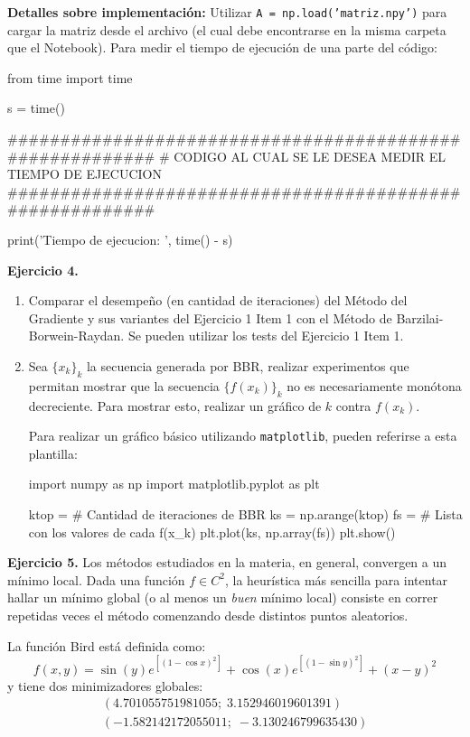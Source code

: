\documentclass{article}
\begin{document}
\textbf{Detalles sobre implementación:}
Utilizar \texttt{A = np.load('matriz.npy')} para cargar la matriz desde el archivo (el cual debe encontrarse en la misma carpeta que el Notebook).
Para medir el tiempo de ejecución de una parte del código: 

\vspace*{\baselineskip}
\begin{python}
from time import time

s = time()

#########################################################
# CODIGO AL CUAL SE LE DESEA MEDIR EL TIEMPO DE EJECUCION
#########################################################

print('Tiempo de ejecucion: ', time() - s)
\end{python}

\vspace*{\baselineskip}
\textbf{Ejercicio 4.} 

\begin{enumerate}
    \item Comparar el desempeño (en cantidad de iteraciones) del Método del Gradiente y sus variantes del Ejercicio 1 Item 1 con el Método de Barzilai-Borwein-Raydan. Se pueden utilizar los tests del Ejercicio 1 Item 1.
    \item Sea $\{x_k\}_k$ la secuencia generada por BBR, realizar experimentos que permitan mostrar que la secuencia $\{f(x_k)\}_k$ no es necesariamente monótona decreciente. Para mostrar esto, realizar un gráfico de $k$ contra $f(x_k)$.

    Para realizar un gráfico básico utilizando \texttt{matplotlib}, pueden referirse a esta plantilla:
    \begin{python}
import numpy as np
import matplotlib.pyplot as plt

ktop = # Cantidad de iteraciones de BBR
ks = np.arange(ktop)
fs = # Lista con los valores de cada f(x_k)
plt.plot(ks, np.array(fs))
plt.show()
    \end{python}
\end{enumerate}

\textbf{Ejercicio 5.} Los métodos estudiados en la materia, en general, convergen a un mínimo local. Dada una función $f\in C^2$, la heurística más sencilla para intentar hallar un mínimo global (o al menos un \textit{buen} mínimo local) consiste en correr repetidas veces el método comenzando desde distintos puntos aleatorios. 

La función Bird está definida como:
\[{\displaystyle f(x,y)=\sin(y)e^{\left[(1-\cos x)^{2}\right]}+\cos(x)e^{\left[(1-\sin y)^{2}\right]}+(x-y)^{2}}\]
y tiene dos minimizadores globales:
\[\begin{array}{l}
    (4.701055751981055;\; 3.152946019601391) \\ 
    (- 1.582142172055011;\; -3.130246799635430)   \\
\end{array}\]
\end{document}
